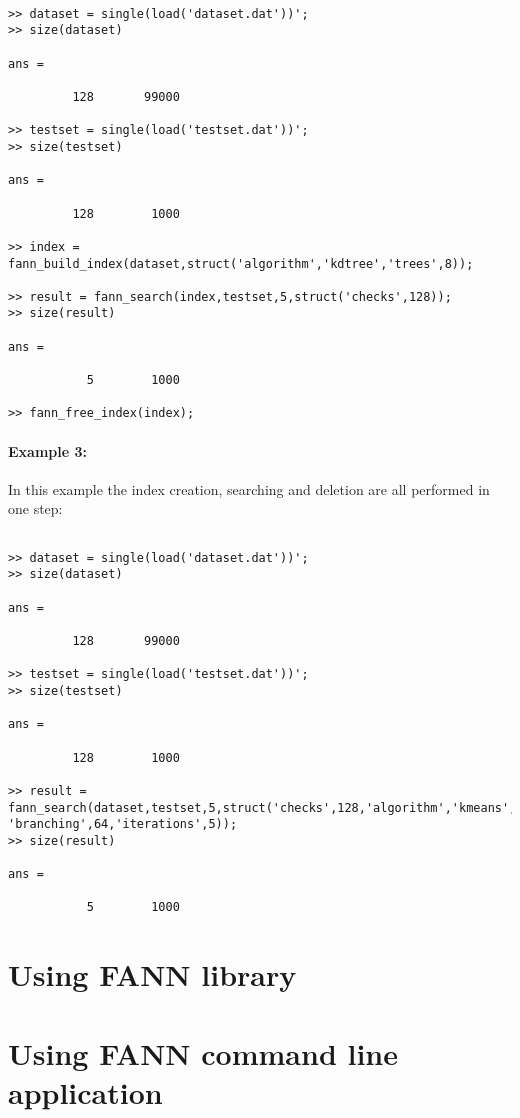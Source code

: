 \documentclass[letter,10pt]{article}
\begin{document}
\begin{Verbatim}[fontsize=\footnotesize,frame=single]

>> dataset = single(load('dataset.dat'))';
>> size(dataset)

ans =

         128       99000

>> testset = single(load('testset.dat'))';
>> size(testset)

ans =

         128        1000

>> index = fann_build_index(dataset,struct('algorithm','kdtree','trees',8));

>> result = fann_search(index,testset,5,struct('checks',128));
>> size(result)

ans =

           5        1000

>> fann_free_index(index);

\end{Verbatim}

\paragraph{Example 3:}

In this example the index creation, searching and deletion are all performed in one step:

\begin{Verbatim}[fontsize=\footnotesize,frame=single]

>> dataset = single(load('dataset.dat'))';
>> size(dataset)

ans =

         128       99000

>> testset = single(load('testset.dat'))';
>> size(testset)

ans =

         128        1000

>> result = fann_search(dataset,testset,5,struct('checks',128,'algorithm','kmeans',
'branching',64,'iterations',5));
>> size(result)

ans =

           5        1000

\end{Verbatim}

\section{Using FANN library}




\section{Using FANN command line application}
\end{document}
